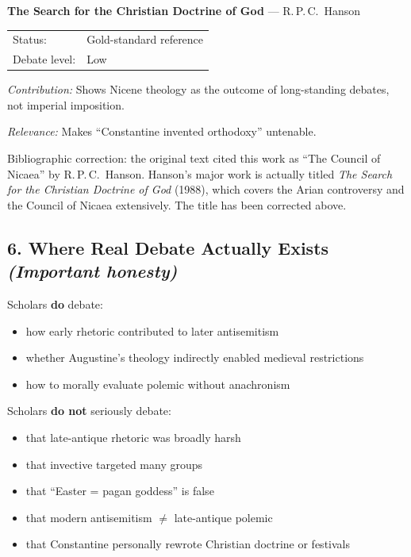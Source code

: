 \documentclass[10pt,twoside,openany]{book}
\begin{document}
\medskip

\textbf{The Search for the Christian Doctrine of God} --- R.\,P.\,C.\ Hanson

\begin{tabular}{@{}ll@{}}
Status: & Gold-standard reference \\
Debate level: & Low
\end{tabular}

\emph{Contribution:}
Shows Nicene theology as the outcome of long-standing debates, not
imperial imposition.

\emph{Relevance:}
Makes ``Constantine invented orthodoxy'' untenable.

\begin{reviewerbox}
Bibliographic correction: the original text cited this
work as ``The Council of Nicaea'' by R.\,P.\,C.\ Hanson.
Hanson's major work is actually titled \emph{The Search for
the Christian Doctrine of God} (1988), which covers the
Arian controversy and the Council of Nicaea
extensively. The title has been corrected above.
\end{reviewerbox}

\subsection{\texorpdfstring{6. Where Real Debate Actually Exists\\{\normalfont\small\itshape (Important honesty)}}{6. Where Real Debate Actually Exists (Important honesty)}}

Scholars \textbf{do} debate:

\begin{itemize}[leftmargin=1.5em]
\item how early rhetoric contributed to later antisemitism
\item whether Augustine's theology indirectly enabled medieval restrictions
\item how to morally evaluate polemic without anachronism
\end{itemize}

Scholars \textbf{do not} seriously debate:

\begin{itemize}[leftmargin=1.5em]
\item that late-antique rhetoric was broadly harsh
\item that invective targeted many groups
\item that ``Easter = pagan goddess'' is false
\item that modern antisemitism $\neq$ late-antique polemic
\item that Constantine personally rewrote Christian doctrine or festivals
\end{itemize}
\end{document}
